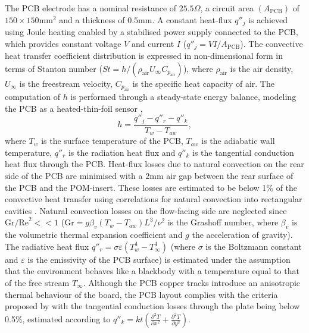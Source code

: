 The PCB electrode has a nominal resistance of $25.5\Omega$, a circuit area $(A_{\mathrm{PCB}})$ of $150\times 150\mathrm{mm}^2$ and a thickness of $0.5\mathrm{mm}$. A constant heat-flux $q''_{j}$ is achieved using Joule heating enabled by a stabilised power supply connected to the PCB, which provides constant voltage $V$ and current $I$ ($q''_{j} = V I / A_{\mathrm{PCB}}$). The convective heat transfer coefficient distribution is expressed in non-dimensional form in terms of Stanton number ($St = h/(\rho_{\mathrm{air}}U_\infty C_{p_{\mathrm{air}}})$), where $\rho_{\mathrm{air}}$ is the air density, $U_\infty$ is the freestream velocity, $C_{p_{\mathrm{air}}}$ is the specific heat capacity of air. The computation of $h$ is performed through a steady-state energy balance, modeling the PCB as a heated-thin-foil sensor \citep{astarita2012infrared}, %
\begin{equation}
	h = \frac{ q''_{j} - q''_{r} - q''_{k} }{ T_{w} - T_{aw} } ,
	\label{eq:heatedthinfoil}
\end{equation}
where $T_{w}$ is the surface temperature of the PCB, $T_{aw}$ is the adiabatic wall temperature, $q''_{r}$ is the radiation heat flux and $q''_{k}$ is the tangential conduction heat flux through the PCB. Heat-flux losses due to natural convection on the rear side of the PCB are minimised with a $2 \mathrm{mm}$ air gap between the rear surface of the PCB and the POM-insert. These losses are estimated to be below 1\% of the convective heat transfer using correlations for natural convection into rectangular cavities \citep{bergman2011fundamentals}. Natural convection losses on the flow-facing side are neglected since $\mathrm{Gr/Re}^2<< 1$ ($\mathrm{Gr} = {g\beta_v(T_{w}-T_{aw}) L^3}/{\nu^2}$ is the Grashoff number, where $\beta_v$ is the volumetric thermal expansion coefficient and $g$ the acceleration of gravity). The radiative heat flux $q''_{r} = \sigma \varepsilon (T_w^4 - T_\infty^4)$ (where $\sigma$ is the Boltzmann constant and $\varepsilon$ is the emissivity of the PCB surface) is estimated under the assumption that the environment behaves like a blackbody with a temperature equal to that of the free stream $T_\infty$. Although the PCB copper tracks introduce an anisotropic thermal behaviour of the board, the PCB layout complies with the criteria proposed by \citet{torre2018HTF} with the tangential conduction losses through the plate being below 0.5\%, estimated according to $q''_{k} = kt \left( \frac{\partial^2T}{\partial x^2} + \frac{\partial^2T}{\partial y^2} \right)$.

